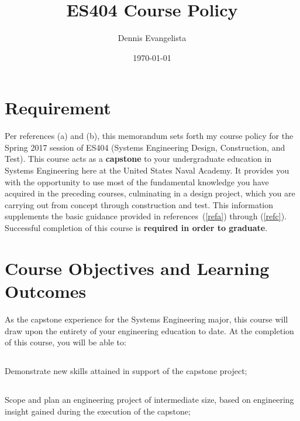 \documentclass[10pt,courier]{navymemo}
\author{Dennis Evangelista}
\title{ES404 Course Policy}
\date{\today}
\begin{document}
\makedateblock{}

\MEMORANDUM{}

\begin{navyletterheader}
\navyskip{}%

\navysubjline{}
\navyskip{}%
\end{navyletterheader}

\section{Requirement}
Per references (a) and (b), this memorandum sets forth my course policy for the Spring 2017 session of ES404 (Systems Engineering Design, Construction, and Test).  This course acts as a \textbf{capstone} to your undergraduate education in Systems Engineering here at the United States Naval Academy.  It provides you with the opportunity to use most of the fundamental knowledge you have acquired in the preceding courses, culminating in a design project, which you are carrying out from concept through construction and test.    This information supplements the basic guidance provided in references~(\ref{refa}) through (\ref{refc}). Successful completion of this course is \textbf{required in order to graduate}.

\section{Course Objectives and Learning Outcomes}  As the capstone experience for the Systems Engineering major, this course will draw upon the entirety of your engineering education to date.  At the completion of this course, you will be able to:
\subsection{} Demonstrate new skills attained in support of the capstone project;
\subsection{} Scope and plan an engineering project of intermediate size, based on engineering insight gained during the execution of the capstone;
\end{document}

